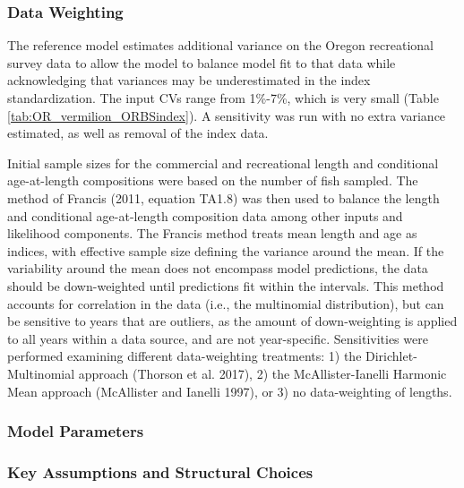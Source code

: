 \documentclass[11pt,
  english,
  letterpaper,
]{article}
\begin{document}
\hypertarget{data-weighting}{%
\subsubsection{Data Weighting}\label{data-weighting}}

The reference model estimates additional variance on the Oregon recreational survey data to allow the model to balance model fit to that data while acknowledging that variances may be underestimated in the index standardization. The input CVs range from 1\%-7\%, which is very small (Table \ref{tab:OR_vermilion_ORBSindex}). A sensitivity was run with no extra variance estimated, as well as removal of the index data.

Initial sample sizes for the commercial and recreational length and conditional age-at-length compositions were based on the number of fish sampled. The method of Francis (2011, equation TA1.8) was then used to balance the length and conditional age-at-length composition data among other inputs and likelihood components. The Francis method treats mean length and age as indices, with effective sample size defining the variance around the mean. If the variability around the mean does not encompass model predictions, the data should be down-weighted until predictions fit within the intervals. This method accounts for correlation in the data (i.e., the multinomial distribution), but can be sensitive to years that are outliers, as the amount of down-weighting is applied to all years within a data source, and are not year-specific. Sensitivities were performed examining different data-weighting treatments: 1) the Dirichlet-Multinomial approach (Thorson et al. 2017), 2) the McAllister-Ianelli Harmonic Mean approach (McAllister and Ianelli 1997), or 3) no data-weighting of lengths.

\hypertarget{model-parameters}{%
\subsubsection{Model Parameters}\label{model-parameters}}

\hypertarget{key-assumptions-and-structural-choices}{%
\subsubsection{Key Assumptions and Structural Choices}\label{key-assumptions-and-structural-choices}}
\end{document}
